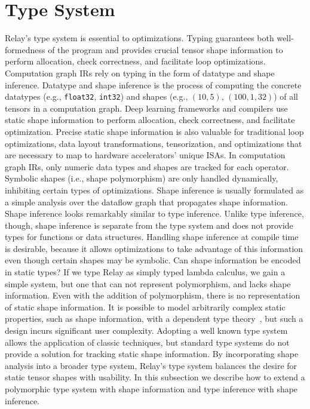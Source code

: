 \section{Type System}
\label{sec:type_system}

Relay's type system is essential
  to optimizations.
Typing guarantees both well-formedness of the program
  and provides crucial tensor shape information to perform allocation,
  check correctness, and facilitate loop optimizations.
Computation graph IRs rely on typing in the form of
  datatype and shape inference.
Datatype and shape inference is the process of computing the
  concrete datatypes (e.g., \verb|float32|, \verb|int32|) and shapes (e.g., $(10, 5)$, $(100, 1, 32)$) of all
  tensors in a computation graph.
Deep learning frameworks and compilers use static shape information
  to perform allocation, check correctness, and facilitate optimization.
Precise static shape information is also valuable for traditional loop
  optimizations, data layout transformations, tensorization, and
  optimizations that are necessary to map to hardware accelerators' unique ISAs.
In computation graph IRs, only numeric data types
  and shapes are tracked for each operator.
Symbolic shapes (i.e., shape polymorphism) are only handled
  dynamically, inhibiting certain types of optimizations.
Shape inference is usually formulated as a simple analysis over the dataflow graph that
  propagates shape information.
Shape inference looks remarkably similar to type inference.
Unlike type inference, though, shape inference is separate from the type system and
  does not provide types for functions or data structures.
Handling shape inference at compile time is desirable, because it allows optimizations to take
  advantage of this information even though certain shapes may be symbolic. Can shape information be encoded in static types?
If we type Relay as simply typed lambda calculus,
  we gain a simple system, but one that can not represent polymorphism,
  and lacks shape information.
Even with the addition of polymorphism, there is no representation of static
  shape information.
  It is possible to model arbitrarily complex static properties, such
  as shape information, with a dependent type theory~\citep{selsam_certigrad}, but such
  a design incurs significant user complexity.
Adopting a well known type system allows the application of
  classic techniques, but standard type systems do not
  provide a solution for tracking static shape information.
By incorporating shape analysis into a broader type system,
  Relay's type system balances the desire for static tensor shapes
  with usability.
In this subsection we describe how to extend a polymorphic type system with shape
  information and type inference with shape inference.

